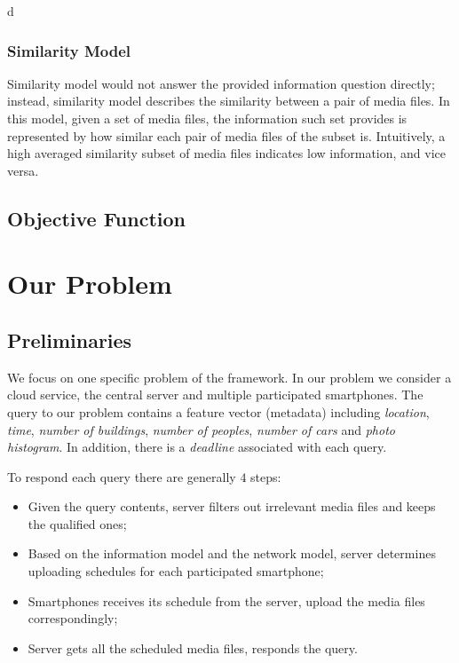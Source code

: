 d\documentclass[letterpaper]{sig-alternate-10pt}
\begin{document}
\subsubsection{Similarity Model}

Similarity model would not answer the provided information question directly; instead, similarity model describes the similarity between a pair of media files. In this model, given a set of media files, the information such set provides is represented by how similar each pair of media files of the subset is. Intuitively, a high averaged similarity subset of media files indicates low information, and vice versa.

\subsection{Objective Function}
\subsubsection{}

\section{Our Problem}
\label{sec:probl}

\subsection{Preliminaries}

We focus on one specific problem of the framework. In our problem we consider a cloud service, the central server and multiple participated smartphones. The query to our problem contains a feature vector (metadata) including \emph{location}, \emph{time}, \emph{number of buildings}, \emph{number of peoples}, \emph{number of cars} and \emph{photo histogram}. In addition, there is a \emph{deadline} associated with each query. 

To respond each query there are generally $4$ steps:
\begin{itemize}
\item Given the query contents, server filters out irrelevant media files and keeps the qualified ones;
\item Based on the information model and the network model, server determines uploading schedules for each participated smartphone;
\item Smartphones receives its schedule from the server, upload the media files correspondingly;
\item Server gets all the scheduled media files, responds the query.
\end{itemize}
\end{document}
